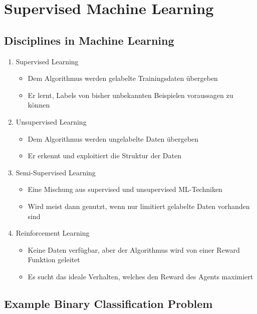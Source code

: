 \documentclass[a4paper]{article}
\begin{document}
	\section{Supervised Machine Learning}
	
		\subsection{Disciplines in Machine Learning}
		
		\begin{enumerate}
			\item Supervised Learning
				\begin{itemize}
					\item Dem Algorithmus werden gelabelte Trainingsdaten übergeben
					\item Er lernt, Labels von bisher unbekannten Beispielen voraussagen zu können
				\end{itemize}
			\item Unsupervised Learning
				\begin{itemize}
					\item Dem Algorithmus werden ungelabelte Daten übergeben
					\item Er erkennt und exploitiert die Struktur der Daten
				\end{itemize}
			\item Semi-Supervised Learning
				\begin{itemize}
					\item Eine Mischung aus supervised und unsupervised ML-Techniken
					\item Wird meist dann genutzt, wenn nur limitiert gelabelte Daten vorhanden sind
				\end{itemize}
			\item Reinforcement Learning
				\begin{itemize}
					\item Keine Daten verfügbar, aber der Algorithmus wird von einer Reward Funktion geleitet
					\item Es sucht das ideale Verhalten, welches den Reward des Agents maximiert
				\end{itemize}
		\end{enumerate}
	
		\subsection{Example Binary Classification Problem}
		
\end{document}

